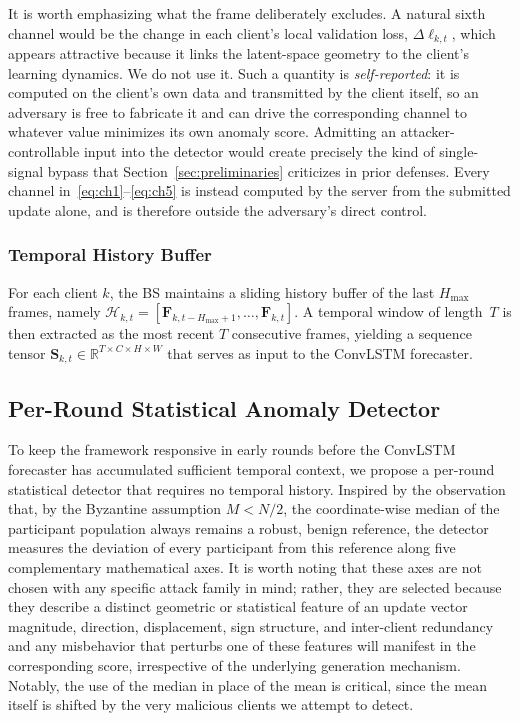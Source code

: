 \documentclass[journal]{IEEEtran}
\begin{document}
It is worth emphasizing what the frame deliberately excludes. A natural sixth channel would be the change in each client's local validation loss, $\Delta\ell_{k,t}$, which appears attractive because it links the latent-space geometry to the client's learning dynamics. We do not use it. Such a quantity is \emph{self-reported}: it is computed on the client's own data and transmitted by the client itself, so an adversary is free to fabricate it and can drive the corresponding channel to whatever value minimizes its own anomaly score. Admitting an attacker-controllable input into the detector would create precisely the kind of single-signal bypass that Section~\ref{sec:preliminaries} criticizes in prior defenses. Every channel in~\eqref{eq:ch1}--\eqref{eq:ch5} is instead computed by the server from the submitted update alone, and is therefore outside the adversary's direct control.

\subsubsection{Temporal History Buffer}
For each client $k$, the BS maintains a sliding history buffer of the last $H_{\max}$ frames, namely $\mathcal{H}_{k,t} = [\mathbf{F}_{k,t-H_{\max}+1}, \ldots, \mathbf{F}_{k,t}]$. A temporal window of length~$T$ is then extracted as the most recent $T$ consecutive frames, yielding a sequence tensor $\mathbf{S}_{k,t} \in \mathbb{R}^{T \times C \times H \times W}$ that serves as input to the ConvLSTM forecaster.

\subsection{Per-Round Statistical Anomaly Detector}
\label{sec:stat_detector}

To keep the framework responsive in early rounds before the ConvLSTM forecaster has accumulated sufficient temporal context, we propose a per-round statistical detector that requires no temporal history. Inspired by the observation that, by the Byzantine assumption $M < N/2$, the coordinate-wise median of the participant population always remains a robust, benign reference, the detector measures the deviation of every participant from this reference along five complementary mathematical axes. It is worth noting that these axes are not chosen with any specific attack family in mind; rather, they are selected because they describe a distinct geometric or statistical feature of an update vector magnitude, direction, displacement, sign structure, and inter-client redundancy and any misbehavior that perturbs one of these features will manifest in the corresponding score, irrespective of the underlying generation mechanism. Notably, the use of the median in place of the mean is critical, since the mean itself is shifted by the very malicious clients we attempt to detect.
\end{document}
